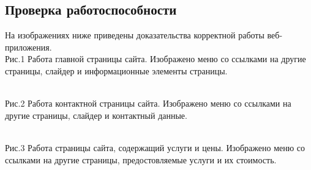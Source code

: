\subsection{\normalsize Проверка работоспособности}
\hspace{1.25cm}
На изображениях ниже приведены доказательства корректной   работы веб-приложения.
\\
Рис.1 Работа главной страницы сайта.
Изображено меню со ссылками на другие страницы, слайдер и информационные элементы страницы.

\\
Рис.2 Работа контактной страницы сайта.
Изображено меню со ссылками на другие страницы, слайдер и контактный данные.

\\
Рис.3 Работа страницы сайта, содержащий услуги и цены.
Изображено меню со ссылками на другие страницы, предостовляемые услуги и их стоимость.


